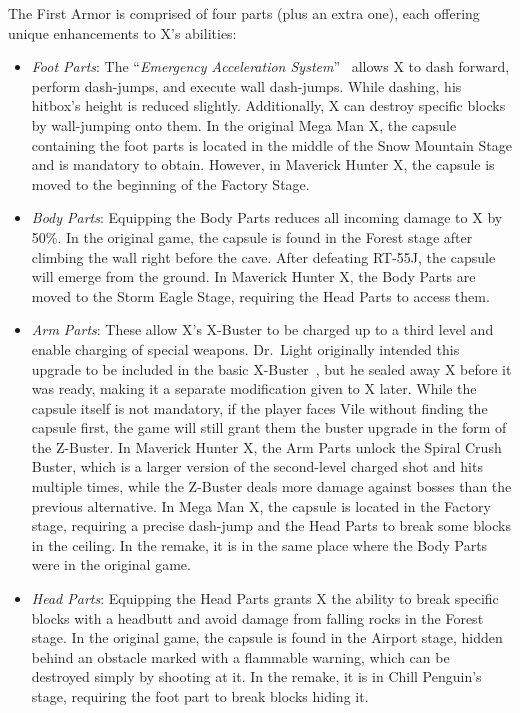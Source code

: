 The First Armor is comprised of four parts (plus an extra one), each offering unique enhancements to X's abilities:
\begin{itemize}
\item \emph{Foot Parts}: The ``\textit{Emergency Acceleration System}''~\cite{X:Manual} allows X to dash forward, perform dash-jumps, and execute wall dash-jumps. While dashing, his hitbox's height is reduced slightly. Additionally, X can destroy specific blocks by wall-jumping onto them. In the original Mega Man X, the capsule containing the foot parts is located in the middle of the Snow Mountain Stage and is mandatory to obtain. However, in Maverick Hunter X, the capsule is moved to the beginning of the Factory Stage.

\item \emph{Body Parts}: Equipping the Body Parts reduces all incoming damage to X by 50\%. In the original game, the capsule is found in the Forest stage after climbing the wall right before the cave. After defeating RT-55J, the capsule will emerge from the ground. In Maverick Hunter X, the Body Parts are moved to the Storm Eagle Stage, requiring the Head Parts to access them.

\item \emph{Arm Parts}: These allow X's X-Buster to be charged up to a third level and enable charging of special weapons. Dr.~Light originally intended this upgrade to be included in the basic X-Buster~\cite{X:Manual}, but he sealed away X before it was ready, making it a separate modification given to X later. While the capsule itself is not mandatory, if the player faces Vile without finding the capsule first, the game will still grant them the buster upgrade in the form of the Z-Buster. In Maverick Hunter X, the Arm Parts unlock the Spiral Crush Buster, which is a larger version of the second-level charged shot and hits multiple times, while the Z-Buster deals more damage against bosses than the previous alternative. In Mega Man X, the capsule is located in the Factory stage, requiring a precise dash-jump and the Head Parts to break some blocks in the ceiling. In the remake, it is in the same place where the Body Parts were in the original game.

\item \emph{Head Parts}: Equipping the Head Parts grants X the ability to break specific blocks with a headbutt and avoid damage from falling rocks in the Forest stage. In the original game, the capsule is found in the Airport stage, hidden behind an obstacle marked with a flammable warning, which can be destroyed simply by shooting at it. In the remake, it is in Chill Penguin's stage, requiring the foot part to break blocks hiding it.


\end{itemize}

